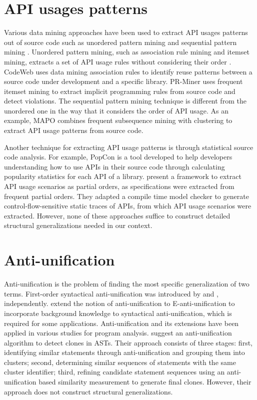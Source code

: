 \section{API usages patterns}  \label{ch7-usage-patterns}
Various data mining approaches have been used to extract API usages patterns out of source code such as unordered pattern mining and sequential pattern mining \cite{robillard2013automated}. Unordered pattern mining, such as association rule mining and itemset mining, extracts a set of API usage rules without considering their order \cite{agrawal1994fast}. CodeWeb \cite{michail2000data} uses data mining association rules to identify reuse patterns between a source code under development and a specific library. PR-Miner \cite{li2005pr} uses frequent itemset mining to extract implicit programming rules from source code and detect violations. The sequential pattern mining technique is different from the unordered one in the way that it considers the order of API usage. As an example, MAPO \cite{xie2006mapo} combines frequent subsequence mining with clustering to extract API usage patterns from source code. 

Another technique for extracting API usage patterns is through statistical source code analysis. For example, PopCon \cite{holmes2008newbie} is a tool developed to help developers understanding how to use APIs in their source code through calculating popularity statistics for each API of a library. \citet{acharya2007mining} present a framework to extract API usage scenarios as partial orders, as specifications were extracted from frequent partial orders. They adapted a compile time model checker to generate control-flow-sensitive static traces of APIs, from which API usage scenarios were extracted. However, none of these approaches suffice to construct detailed structural generalizations needed in our context.
\section{Anti-unification}  \label{ch7-au}
Anti-unification is the problem of finding the most specific generalization of two terms. First-order syntactical anti-unification was introduced by \citet{plotkin1970note} and \citet{reynolds1970transformational}, independently. \citet{burghardt1996implementing} extend the notion of anti-unification to E-anti-unification to incorporate background knowledge to syntactical anti-unification, which is required for some applications. Anti-unification and its extensions have been applied in various studies for program analysis. \citet{bulychev2009evaluation} suggest an anti-unification algorithm to detect clones in ASTs. Their approach consists of three stages: first, identifying similar statements through anti-unification and grouping them into clusters; second, determining similar sequences of statements with the same cluster identifier; third, refining candidate statement sequences using an anti-unification based similarity measurement to generate final clones. However, their approach does not construct structural generalizations.

